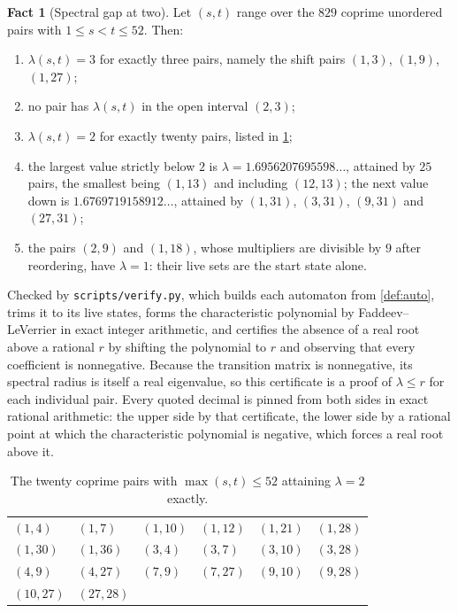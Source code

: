 \documentclass[11pt]{amsart}
\theoremstyle{definition}
\newtheorem{fact}[theorem]{Fact}
\theoremstyle{remark}
\begin{document}
\begin{fact}[Spectral gap at two]
\label{fact:spectrum}
Let $(s,t)$ range over the $829$ coprime unordered pairs with $1\le s<t\le 52$. Then:
\begin{enumerate}
\item $\lambda(s,t)=3$ for exactly three pairs, namely the shift pairs $(1,3)$, $(1,9)$, $(1,27)$;
\item no pair has $\lambda(s,t)$ in the open interval $(2,3)$;
\item $\lambda(s,t)=2$ for exactly twenty pairs, listed in \cref{tab:two};
\item the largest value strictly below $2$ is $\lambda=1.6956207695598\ldots$, attained by $25$ pairs, the smallest being $(1,13)$ and including $(12,13)$; the next value down is $1.6769719158912\ldots$, attained by $(1,31)$, $(3,31)$, $(9,31)$ and $(27,31)$;
\item the pairs $(2,9)$ and $(1,18)$, whose multipliers are divisible by $9$ after reordering, have $\lambda=1$: their live sets are the start state alone.
\end{enumerate}
Checked by \texttt{scripts/verify.py}, which builds each automaton from \cref{def:auto}, trims it to its live states, forms the characteristic polynomial by Faddeev--LeVerrier in exact integer arithmetic, and certifies the absence of a real root above a rational $r$ by shifting the polynomial to $r$ and observing that every coefficient is nonnegative. Because the transition matrix is nonnegative, its spectral radius is itself a real eigenvalue, so this certificate is a proof of $\lambda\le r$ for each individual pair. Every quoted decimal is pinned from both sides in exact rational arithmetic: the upper side by that certificate, the lower side by a rational point at which the characteristic polynomial is negative, which forces a real root above it.
\end{fact}

\begin{table}[ht]
\centering
\begin{tabular}{llllll}
\toprule
$(1,4)$ & $(1,7)$ & $(1,10)$ & $(1,12)$ & $(1,21)$ & $(1,28)$ \\
$(1,30)$ & $(1,36)$ & $(3,4)$ & $(3,7)$ & $(3,10)$ & $(3,28)$ \\
$(4,9)$ & $(4,27)$ & $(7,9)$ & $(7,27)$ & $(9,10)$ & $(9,28)$ \\
$(10,27)$ & $(27,28)$ & & & & \\
\bottomrule
\end{tabular}
\caption{The twenty coprime pairs with $\max(s,t)\le 52$ attaining $\lambda=2$ exactly.}
\label{tab:two}
\end{table}
\end{document}

